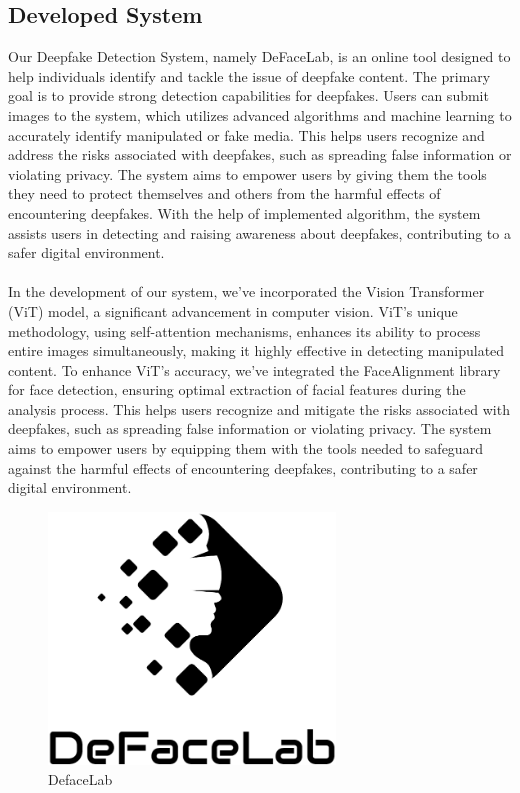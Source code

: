 \subsection{Developed System}

Our Deepfake Detection System, namely DeFaceLab, is an online tool designed to help individuals identify and tackle the issue of deepfake content. The primary goal is to provide strong detection capabilities for deepfakes. Users can submit images to the system, which utilizes advanced algorithms and machine learning to accurately identify manipulated or fake media. This helps users recognize and address the risks associated with deepfakes, such as spreading false information or violating privacy. The system aims to empower users by giving them the tools they need to protect themselves and others from the harmful effects of encountering deepfakes. With the help of implemented algorithm, the system assists users in detecting and raising awareness about deepfakes, contributing to a safer digital environment.\\
\\
In the development of our system, we've incorporated the Vision Transformer (ViT) model, a significant advancement in computer vision. ViT's unique methodology, using self-attention mechanisms, enhances its ability to process entire images simultaneously, making it highly effective in detecting manipulated content. To enhance ViT's accuracy, we've integrated the FaceAlignment library for face detection, ensuring optimal extraction of facial features during the analysis process. This helps users recognize and mitigate the risks associated with deepfakes, such as spreading false information or violating privacy. The system aims to empower users by equipping them with the tools needed to safeguard against the harmful effects of encountering deepfakes, contributing to a safer digital environment.
\begin{figure}[h]
    \centering
    \includegraphics[width= 3in ]{img/logoblack.png}
    \caption{DefaceLab}
\end{figure}